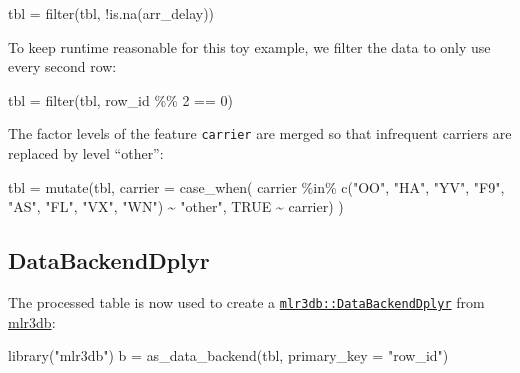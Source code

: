 \documentclass[
]{scrbook}
\newenvironment{Shaded}{\begin{snugshade}}{\end{snugshade}}
\newcommand{\AttributeTok}[1]{\textcolor[rgb]{0.77,0.63,0.00}{#1}}
\newcommand{\ConstantTok}[1]{\textcolor[rgb]{0.00,0.00,0.00}{#1}}
\newcommand{\DecValTok}[1]{\textcolor[rgb]{0.00,0.00,0.81}{#1}}
\newcommand{\FunctionTok}[1]{\textcolor[rgb]{0.00,0.00,0.00}{#1}}
\newcommand{\NormalTok}[1]{#1}
\newcommand{\OtherTok}[1]{\textcolor[rgb]{0.56,0.35,0.01}{#1}}
\newcommand{\SpecialCharTok}[1]{\textcolor[rgb]{0.00,0.00,0.00}{#1}}
\newcommand{\StringTok}[1]{\textcolor[rgb]{0.31,0.60,0.02}{#1}}
\renewenvironment{Shaded} {\begin{snugshade}\small} {\end{snugshade}}
\begin{document}
\begin{Shaded}
\begin{Highlighting}[]
\NormalTok{tbl }\OtherTok{=} \FunctionTok{filter}\NormalTok{(tbl, }\SpecialCharTok{!}\FunctionTok{is.na}\NormalTok{(arr\_delay))}
\end{Highlighting}
\end{Shaded}

To keep runtime reasonable for this toy example, we filter the data to only use every second row:

\begin{Shaded}
\begin{Highlighting}[]
\NormalTok{tbl }\OtherTok{=} \FunctionTok{filter}\NormalTok{(tbl, row\_id }\SpecialCharTok{\%\%} \DecValTok{2} \SpecialCharTok{==} \DecValTok{0}\NormalTok{)}
\end{Highlighting}
\end{Shaded}

The factor levels of the feature \texttt{carrier} are merged so that infrequent carriers are replaced by level ``other'':

\begin{Shaded}
\begin{Highlighting}[]
\NormalTok{tbl }\OtherTok{=} \FunctionTok{mutate}\NormalTok{(tbl, }\AttributeTok{carrier =} \FunctionTok{case\_when}\NormalTok{(}
\NormalTok{    carrier }\SpecialCharTok{\%in\%} \FunctionTok{c}\NormalTok{(}\StringTok{"OO"}\NormalTok{, }\StringTok{"HA"}\NormalTok{, }\StringTok{"YV"}\NormalTok{, }\StringTok{"F9"}\NormalTok{, }\StringTok{"AS"}\NormalTok{, }\StringTok{"FL"}\NormalTok{, }\StringTok{"VX"}\NormalTok{, }\StringTok{"WN"}\NormalTok{) }\SpecialCharTok{\textasciitilde{}} \StringTok{"other"}\NormalTok{,}
    \ConstantTok{TRUE} \SpecialCharTok{\textasciitilde{}}\NormalTok{ carrier)}
\NormalTok{)}
\end{Highlighting}
\end{Shaded}

\hypertarget{databackenddplyr}{%
\subsection{DataBackendDplyr}\label{databackenddplyr}}

The processed table is now used to create a \href{https://mlr3db.mlr-org.com/reference/DataBackendDplyr.html}{\texttt{mlr3db::DataBackendDplyr}} from \href{https://mlr3db.mlr-org.com}{mlr3db}:

\begin{Shaded}
\begin{Highlighting}[]
\FunctionTok{library}\NormalTok{(}\StringTok{"mlr3db"}\NormalTok{)}
\NormalTok{b }\OtherTok{=} \FunctionTok{as\_data\_backend}\NormalTok{(tbl, }\AttributeTok{primary\_key =} \StringTok{"row\_id"}\NormalTok{)}
\end{Highlighting}
\end{Shaded}
\end{document}
